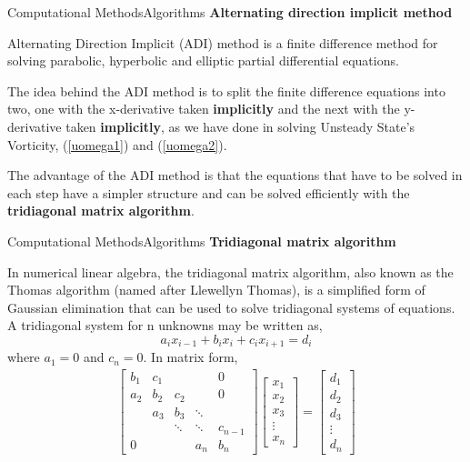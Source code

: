 \documentclass[11pt]{beamer}
\begin{document}
\begin{frame}{Computational Methods}{Algorithms}
\textbf{Alternating direction implicit method}\linebreak

Alternating Direction Implicit (ADI) method is a finite difference method for solving parabolic, hyperbolic and elliptic partial differential equations.\linebreak

The idea behind the ADI method is to split the finite difference equations into two, one with the x-derivative taken \textbf{implicitly} and the next with the y-derivative taken \textbf{implicitly}, as we have done in solving Unsteady State's Vorticity, (\ref{uomega1}) and (\ref{uomega2}).\linebreak

The advantage of the ADI method is that the equations that have to be solved in each step have a simpler structure and can be solved efficiently with the \textbf{tridiagonal matrix algorithm}.
\end{frame}

\begin{frame}{Computational Methods}{Algorithms}
\textbf{Tridiagonal matrix algorithm}\linebreak

In numerical linear algebra, the tridiagonal matrix algorithm, also known as the Thomas algorithm (named after Llewellyn Thomas), is a simplified form of Gaussian elimination that can be used to solve tridiagonal systems of equations. A tridiagonal system for n unknowns may be written as,
$$a_{i}x_{i-1} + b_{i}x_{i} + c_{i}x_{i+1} = d_{i}$$
where $a_{1}=0$ and $c_{n}=0$. In matrix form,
\begin{eqnarray}
\begin{bmatrix}
b_{1} & c_{1} &  &  & 0 \\ 
a_{2} & b_{2} & c_{2}  &  & 0 \\ 
&a_{3}&b_{3}&\ddots&	\\
&&\ddots&\ddots&c_{n-1}	\\
0&&&a_{n}&b_{n}
\end{bmatrix}
\begin{bmatrix}
x_{1}\\
x_{2}\\
x_{3}\\
\vdots\\
x_{n}
\end{bmatrix}=
\begin{bmatrix}
d_{1}\\
d_{2}\\
d_{3}\\
\vdots\\
d_{n}
\end{bmatrix}
\end{eqnarray}
\end{frame}
\end{document}
